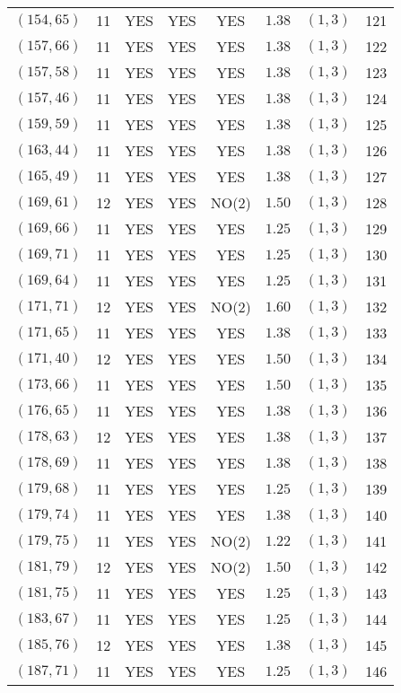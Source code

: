 \begin{longtable}{|c|c|c|c|c|c|c|c|}
$(154,65)$ & 11 & YES & YES & YES & $1.38$ & $(1,3)$ & 121\\
$(157,66)$ & 11 & YES & YES & YES & $1.38$ & $(1,3)$ & 122\\
$(157,58)$ & 11 & YES & YES & YES & $1.38$ & $(1,3)$ & 123\\
$(157,46)$ & 11 & YES & YES & YES & $1.38$ & $(1,3)$ & 124\\
$(159,59)$ & 11 & YES & YES & YES & $1.38$ & $(1,3)$ & 125\\
$(163,44)$ & 11 & YES & YES & YES & $1.38$ & $(1,3)$ & 126\\
$(165,49)$ & 11 & YES & YES & YES & $1.38$ & $(1,3)$ & 127\\
$(169,61)$ & 12 & YES & YES & NO(2) & $1.50$ & $(1,3)$ & 128\\
$(169,66)$ & 11 & YES & YES & YES & $1.25$ & $(1,3)$ & 129\\
$(169,71)$ & 11 & YES & YES & YES & $1.25$ & $(1,3)$ & 130\\
$(169,64)$ & 11 & YES & YES & YES & $1.25$ & $(1,3)$ & 131\\
$(171,71)$ & 12 & YES & YES & NO(2) & $1.60$ & $(1,3)$ & 132\\
$(171,65)$ & 11 & YES & YES & YES & $1.38$ & $(1,3)$ & 133\\
$(171,40)$ & 12 & YES & YES & YES & $1.50$ & $(1,3)$ & 134\\
$(173,66)$ & 11 & YES & YES & YES & $1.50$ & $(1,3)$ & 135\\
$(176,65)$ & 11 & YES & YES & YES & $1.38$ & $(1,3)$ & 136\\
$(178,63)$ & 12 & YES & YES & YES & $1.38$ & $(1,3)$ & 137\\
$(178,69)$ & 11 & YES & YES & YES & $1.38$ & $(1,3)$ & 138\\
$(179,68)$ & 11 & YES & YES & YES & $1.25$ & $(1,3)$ & 139\\
$(179,74)$ & 11 & YES & YES & YES & $1.38$ & $(1,3)$ & 140\\
$(179,75)$ & 11 & YES & YES & NO(2) & $1.22$ & $(1,3)$ & 141\\
$(181,79)$ & 12 & YES & YES & NO(2) & $1.50$ & $(1,3)$ & 142\\
$(181,75)$ & 11 & YES & YES & YES & $1.25$ & $(1,3)$ & 143\\
$(183,67)$ & 11 & YES & YES & YES & $1.25$ & $(1,3)$ & 144\\
$(185,76)$ & 12 & YES & YES & YES & $1.38$ & $(1,3)$ & 145\\
$(187,71)$ & 11 & YES & YES & YES & $1.25$ & $(1,3)$ & 146\\

\end{longtable}
